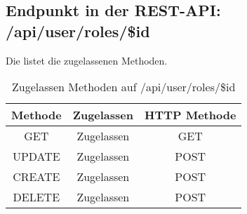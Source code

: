 \subsection{Endpunkt in der REST-API: /api/user/roles/\$id}
Die  listet die zugelassenen Methoden. 

\begin{table}[!htbp]
	\begin{tabular}{|c|c|c|}
		\hline
			\textbf{Methode} & \textbf{Zugelassen} & \textbf{HTTP Methode} \\ \hline
			GET & Zugelassen & GET \\ \hline
			UPDATE & Zugelassen & POST \\ \hline 
			CREATE & Zugelassen & POST \\ \hline 
			DELETE & Zugelassen & POST \\ \hline
	\end{tabular}

		\caption{Zugelassen Methoden auf /api/user/roles/\$id}
		\label{tab:end:rest:api:user:roles:id:meth}
\end{table}